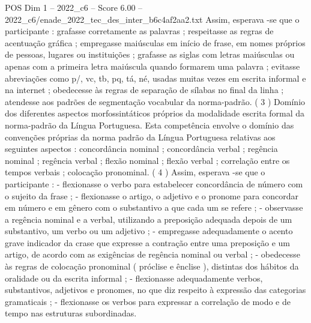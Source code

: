 \begin{textsample}{POS Dim 1 – 2022\_c6 – Score 6.00 – 2022\_c6/enade\_2022\_tec\_des\_inter\_b6c4af2aa2.txt}
Assim, esperava -se que o participante : grafasse corretamente as palavras ; respeitasse as regras de acentuação gráfica ; empregasse maiúsculas em início de frase, em nomes próprios de pessoas, lugares ou instituições ; grafasse as siglas com letras maiúsculas ou apenas com a primeira letra maiúscula quando formarem uma palavra ; evitasse abreviações como p/, vc, tb, pq, tá, né, usadas muitas vezes em escrita informal e na internet ; obedecesse às regras de separação de sílabas no final da linha ; atendesse aos padrões de segmentação vocabular da norma-padrão. ( 3 ) Domínio dos diferentes aspectos morfossintáticos próprios da modalidade escrita formal da norma-padrão da Língua Portuguesa.
Esta competência envolve o domínio das convenções próprias da norma padrão da Língua Portuguesa relativas aos seguintes aspectos : concordância nominal ; concordância verbal ; regência nominal ; regência verbal ; flexão nominal ; flexão verbal ; correlação entre os tempos verbais ; colocação pronominal. ( 4 ) Assim, esperava -se que o participante : - flexionasse o verbo para estabelecer concordância de número com o sujeito da frase ; - flexionasse o artigo, o adjetivo e o pronome para concordar em número e em gênero com o substantivo a que cada um se refere ; - observasse a regência nominal e a verbal, utilizando a preposição adequada depois de um substantivo, um verbo ou um adjetivo ; - empregasse adequadamente o acento grave indicador da crase que expresse a contração entre uma preposição e um artigo, de acordo com as exigências de regência nominal ou verbal ; - obedecesse às regras de colocação pronominal ( próclise e ênclise ), distintas dos hábitos da oralidade ou da escrita informal ; - flexionasse adequadamente verbos, substantivos, adjetivos e pronomes, no que diz respeito à expressão das categorias gramaticais ; - flexionasse os verbos para expressar a correlação de modo e de tempo nas estruturas subordinadas.

\end{textsample}
